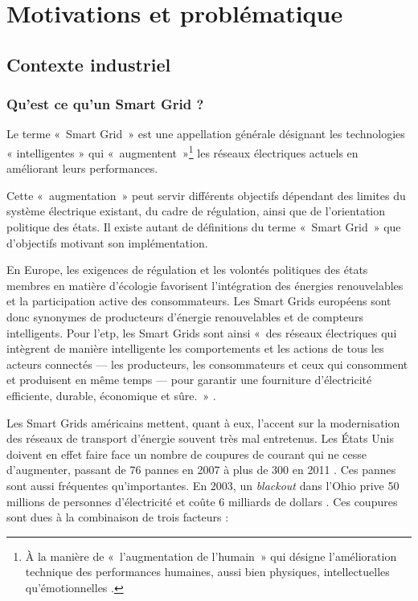 \chapter{Motivations et problématique}
\label{ch:problematique}

\section{Contexte industriel}

\subsection{Qu'est ce qu'un Smart Grid ?}

Le terme «~Smart Grid~» est une appellation générale désignant les technologies 
« intelligentes » qui «~augmentent~»\footnote{À la manière de «~l'augmentation 
de l'humain~» qui désigne l'amélioration technique des performances humaines, 
aussi bien physiques, intellectuelles qu'émotionnelles \cite{le2013humain}.} 
les réseaux électriques actuels en améliorant leurs performances. 

Cette «~augmentation~» peut servir différents objectifs dépendant des limites du 
système électrique existant, du cadre de régulation, ainsi que de 
l'orientation politique des états. Il existe autant de définitions du terme 
«~Smart Grid~» que d'objectifs motivant son implémentation. 

En Europe, les exigences de régulation et les volontés politiques des états 
membres en matière d'écologie favorisent l'intégration des énergies 
renouvelables et la participation active des consommateurs. Les Smart Grids 
européens sont donc synonymes de producteurs d'énergie renouvelables et de 
compteurs intelligents. Pour l'\gls{etp}, les Smart Grids sont ainsi «~des 
réseaux électriques qui intègrent de manière intelligente les comportements et 
les actions de tous les acteurs connectés — les producteurs, les consommateurs 
et ceux qui consomment et produisent en même temps — pour garantir une 
fourniture d'électricité efficiente, durable, économique et sûre.~» \cite{ETP}.

Les Smart Grids américains mettent, quant à eux, l'accent sur la modernisation 
des réseaux de transport d'énergie souvent très mal entretenus. Les États Unis 
doivent en effet faire face un nombre de coupures de courant qui ne cesse 
d'augmenter, passant de 76 pannes en 2007 à plus de 300 en 2011 \cite{detroit}. 
Ces pannes sont aussi fréquentes qu'importantes. En 2003, un \textit{blackout} 
dans l'Ohio prive 50 millions de personnes d'électricité et coûte 6 milliards 
de dollars \cite{andersson2005causes}. Ces coupures sont dues à la combinaison 
de trois facteurs \cite{outages}:

